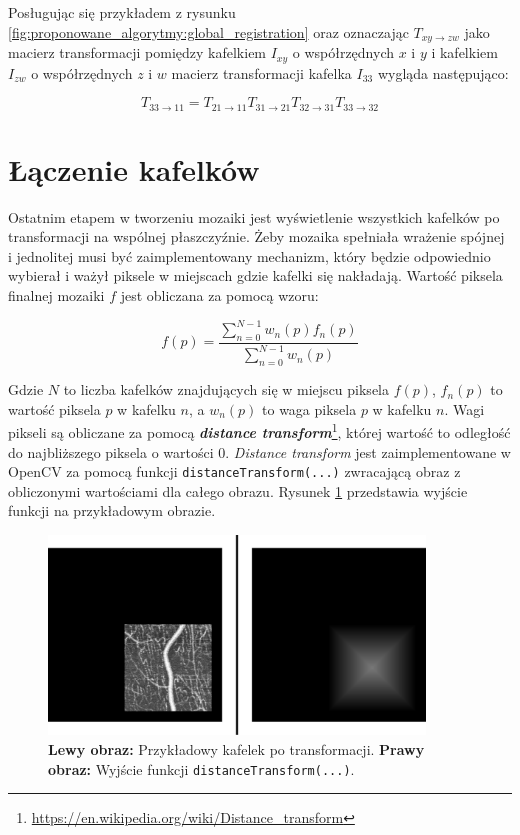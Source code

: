Posługując się przykładem z rysunku \ref{fig:proponowane_algorytmy:global_registration} oraz oznaczając $T_{xy\rightarrow zw}$ jako macierz transformacji pomiędzy kafelkiem $I_{xy}$ o współrzędnych $x$ i $y$ i kafelkiem $I_{zw}$ o współrzędnych $z$ i $w$ macierz transformacji kafelka $I_{33}$ wygląda następująco:

\begin{equation}
T_{33\rightarrow 11} = T_{21\rightarrow 11}T_{31\rightarrow 21}T_{32\rightarrow 31}T_{33\rightarrow 32}
\end{equation}

\section{Łączenie kafelków}
\label{sec:proponowane_algorytmy:laczenie_kafelkow}

Ostatnim etapem w tworzeniu mozaiki jest wyświetlenie wszystkich kafelków po transformacji na wspólnej płaszczyźnie. Żeby mozaika spełniała wrażenie spójnej i jednolitej musi być zaimplementowany mechanizm, który będzie odpowiednio wybierał i ważył piksele w miejscach gdzie kafelki się nakładają. Wartość piksela finalnej mozaiki $f$ jest obliczana za pomocą wzoru:

\begin{equation}
f(p) = \frac{\sum_{n = 0}^{N - 1} w_n(p)f_n(p)}{\sum_{n = 0}^{N - 1} w_n(p)}
\end{equation}

Gdzie $N$ to liczba kafelków znajdujących się w miejscu piksela $f(p)$, $f_n(p)$ to wartość piksela $p$ w kafelku $n$, a $w_n(p)$ to waga piksela $p$ w kafelku $n$. Wagi pikseli są obliczane za pomocą \textbf{\textit{distance transform}}\footnote{\url{https://en.wikipedia.org/wiki/Distance_transform}}, której wartość to odległość do najbliższego piksela o wartości 0. \textit{Distance transform} jest zaimplementowane w OpenCV za pomocą funkcji \texttt{distanceTransform(...)} zwracającą obraz z obliczonymi wartościami dla całego obrazu. Rysunek \ref{fig:proponowane_algorytmy:dis} przedstawia wyjście funkcji na przykładowym obrazie.

\begin{figure}[H]
  \centering
  \includegraphics[width=10cm]{gfx/dis}
  \caption{\textbf{Lewy obraz:} Przykładowy kafelek po transformacji. \textbf{Prawy obraz:} Wyjście funkcji \texttt{distanceTransform(...)}.}
  \label{fig:proponowane_algorytmy:dis}
\end{figure}

